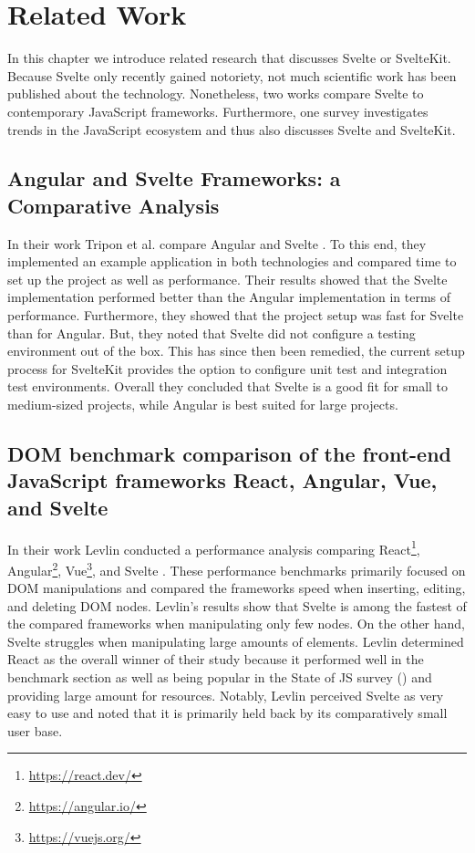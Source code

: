\chapter{Related Work}
\label{ch:related-work}

In this chapter we introduce related research that discusses Svelte or SvelteKit. Because Svelte only recently gained notoriety, not much scientific work has been published about the technology. Nonetheless, two works compare Svelte to contemporary JavaScript frameworks. Furthermore, one survey investigates trends in the JavaScript ecosystem and thus also discusses Svelte and SvelteKit.

\section{Angular and Svelte Frameworks: a Comparative Analysis}
In their work Tripon et al. compare Angular and Svelte \cite{tripon_angular_2021}. To this end, they implemented an example application in both technologies and compared time to set up the project as well as performance. Their results showed that the Svelte implementation performed better than the Angular implementation in terms of performance. Furthermore, they showed that the project setup was fast for Svelte than for Angular. But, they noted that Svelte did not configure a testing environment out of the box. This has since then been remedied, the current setup process for SvelteKit provides the option to configure unit test and integration test environments. Overall they concluded that Svelte is a good fit for small to medium-sized projects, while Angular is best suited for large projects.  

\section{DOM benchmark comparison of the front-end JavaScript frameworks React, Angular, Vue, and Svelte}
In their work Levlin conducted a performance analysis comparing React\footnote{\url{https://react.dev/}}, Angular\footnote{\url{https://angular.io/}}, Vue\footnote{\url{https://vuejs.org/}}, and Svelte \cite{levlin_dom_2020}. These performance benchmarks primarily focused on DOM manipulations and compared the frameworks speed when inserting, editing, and deleting DOM nodes. Levlin's results show that Svelte is among the fastest of the compared frameworks when manipulating only few nodes. On the other hand, Svelte struggles when manipulating large amounts of elements. Levlin determined React as the overall winner of their study because it performed well in the benchmark section as well as being popular in the State of JS survey () and providing large amount for resources. Notably, Levlin perceived Svelte as very easy to use and noted that it is primarily held back by its comparatively small user base.   

